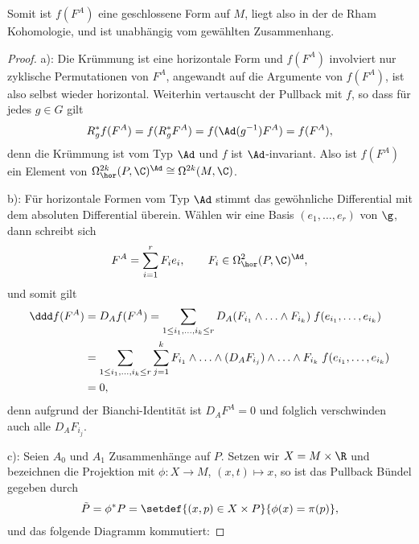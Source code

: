 \documentclass[%
	paper=a5,%
	fleqn,%
	DIV=18,%
	BCOR=0mm,
	fontsize=11pt,
	titlepage=false,%
	bibliography=totoc,
	DIV=18,%
	twoside=true,
	pdftitle=Riemannsche Geometrie,
	pdfauthor=Uwe Semmelmann,
	numbers=noendperiod]%
	{scrbook}
\begin{document}
Somit ist $f(F^A)$ eine geschlossene Form auf $M$, liegt also in der de Rham
Kohomologie, und ist unabhängig vom gewählten Zusammenhang.

\begin{proof}
a): Die Krümmung ist eine horizontale Form und $f(F^A)$ involviert nur zyklische
Permutationen von $F^A$, angewandt auf die Argumente von $f(F^A)$, ist also
selbst wieder horizontal. Weiterhin vertauscht der Pullback mit $f$, so dass für
jedes $g\in G$ gilt
\begin{align*}
R_g^*f(F^A) = f(R_g^* F^A) = f(\Ad(g^{-1})F^A) = f(F^A), 
\end{align*}
denn die Krümmung ist vom Typ $\Ad$ und $f$ ist $\Ad$-invariant. Also ist
$f(F^A)$ ein Element von $\Omega^{2k}_\hor(P,\C)^{\Ad}\cong \Omega^{2k}(M,\C)$.

b): Für horizontale Formen vom Typ $\Ad$ stimmt das gewöhnliche Differential mit
dem absoluten Differential überein. Wählen wir eine Basis $(e_1,\ldots,e_r)$ von
$\g$, dann schreibt sich
\begin{align*}
F^A = \sum_{i=1}^r F_i e_i,\qquad F_i\in \Omega_\hor^2(P,\C)^{\Ad},
\end{align*}
und somit gilt
\begin{align*}
\ddd f(F^A) &= D_A f(F^A)
=  \sum_{1\le i_1,\ldots,i_k \le r} D_A(F_{i_1}\wedge \ldots \wedge F_{i_k})\;
f(e_{i_1},\ldots,e_{i_k})\\
&= 
\sum_{1\le i_1,\ldots,i_k \le r} \sum_{j=1}^k F_{i_1}\wedge \ldots\wedge (D_A
F_{i_j}) \wedge \ldots \wedge F_{i_k}\; f(e_{i_1},\ldots,e_{i_k})\\
&=0,
\end{align*}
denn aufgrund der Bianchi-Identität ist $D_A F^A = 0$ und folglich verschwinden
auch alle $D_A F_{i_j}$.

c): Seien $A_0$ und $A_1$ Zusammenhänge auf $P$. Setzen wir $X= M\times \R$ und
bezeichnen die Projektion mit
$\phi: X\to M$, $(x,t)\mapsto x$,
so ist das Pullback Bündel gegeben durch
\begin{align*}
\tilde{P} = \phi^*P = \setdef{(x,p)\in X\times P}{\phi(x)=\pi(p)},
\end{align*}
und das folgende Diagramm kommutiert:

{

\centering


}
\end{proof}
\end{document}
